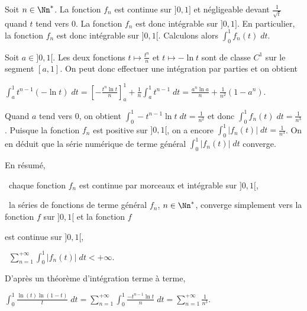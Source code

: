 {\begin{enumerate}
{Soit $n\in\Nn^*$. La fonction $f_n$ est continue sur $]0,1]$ et négligeable devant $\frac{1}{\sqrt{t}}$ quand $t$ tend vers $0$. La fonction $f_n$ est donc intégrable sur $]0,1]$. En particulier, la fonction $f_n$ est donc intégrable sur $]0,1[$. Calculons alors $\int_{0}^{1}f_n(t)\;dt$.

Soit $a\in]0,1[$. Les deux fonctions $t\mapsto\frac{t^n}{n}$ et $t\mapsto-\ln t$ sont de classe $C^1$ sur le segment $[a,1]$. On peut donc effectuer une intégration par parties et on obtient

\begin{center}
$\int_{a}^{1}t^{n-1}(-\ln t)\;dt=\left[-\frac{t^n\ln t}{n}\right]_a^1+\frac{1}{n}\int_{a}^{1}t^{n-1}\;dt=\frac{a^n\ln a}{n}+\frac{1}{n^2}(1-a^n)$.
\end{center}

Quand $a$ tend vers $0$, on obtient $\int_{0}^{1}-t^{n-1}\ln t\;dt=\frac{1}{n^2}$ et donc $\int_{0}^{1}f_n(t)\;dt=\frac{1}{n^3}$. Puisque la fonction $f_n$ est positive sur $]0,1[$, on a encore $\int_{0}^{1}|f_n(t)|\;dt=\frac{1}{n^3}$. On en déduit que la série numérique de terme général $\int_{0}^{1}|f_n(t)|\;dt$ converge.

En résumé,

\textbullet~chaque fonction $f_n$ est continue par morceaux et intégrable sur $]0,1[$,

\textbullet~la séries de fonctions de terme général $f_n$, $n\in\Nn^*$, converge simplement vers la fonction $f$ sur $]0,1[$ et la fonction $f$

est continue sur $]0,1[$,

\textbullet~$\sum_{n=1}^{+\infty}\int_{0}^{1}|f_n(t)|\;dt<+\infty$.

D'après un théorème d'intégration terme à terme,

\begin{center}
$\int_{0}^{1}\frac{\ln(t)\ln(1-t)}{t}\;dt=\sum_{n=1}^{+\infty}\int_{0}^{1}\frac{-t^{n-1}\ln t}{n}\;dt=\sum_{n=1}^{+\infty}\frac{1}{n^3}$.
\end{center}

\begin{center}
\end{center}}
\end{enumerate}
}
